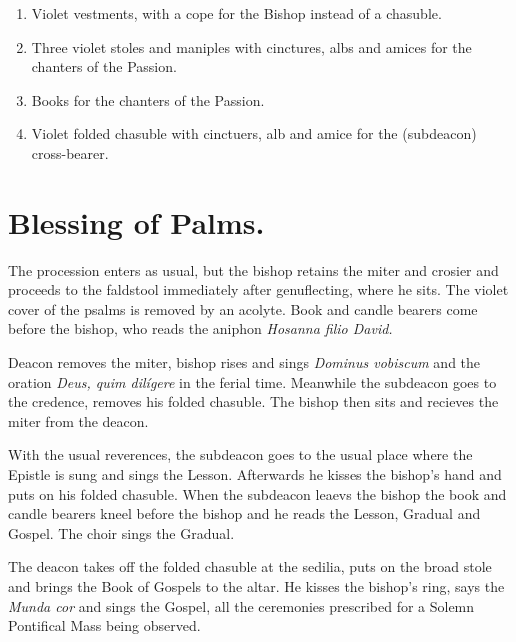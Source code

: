 {\begin{enumerate}[label=\Roman*.]
        \begin{enumerate}[label=\arabic*.]

            \item Violet vestments, with a cope for the Bishop instead of a
                chasuble.

            \item Three violet stoles and maniples with cinctures, albs and
                amices for the chanters of the Passion.

            \item Books for the chanters of the Passion.

            \item Violet folded chasuble with cinctuers, alb and amice for the
                (subdeacon) cross-bearer.

        \end{enumerate}

\end{enumerate}

\section{Blessing of Palms.}

\rubric The procession enters as usual, but the bishop retains the miter and
crosier and proceeds to the faldstool immediately after genuflecting, where he
sits. The violet cover of the psalms is removed by an acolyte. Book and candle
bearers come before the bishop, who reads the aniphon \textit{Hosanna filio
David.}

\rubric Deacon removes the miter, bishop rises and sings \textit{Dominus
vobiscum} and the oration \textit{Deus, quim dilígere} in the ferial time.
Meanwhile the subdeacon goes to the credence, removes his folded chasuble. The
bishop then sits and recieves the miter from the deacon. 

\rubric With the usual reverences, the subdeacon goes to the usual place where
the Epistle is sung and sings the Lesson. Afterwards he kisses the bishop's
hand and puts on his folded chasuble. When the subdeacon leaevs the bishop the
book and candle bearers kneel before the bishop and he reads the Lesson,
Gradual and Gospel. The choir sings the Gradual.

\rubric The deacon takes off the folded chasuble at the sedilia, puts on the
broad stole and brings the Book of Gospels to the altar. He kisses the bishop's
ring, says the \textit{Munda cor} and sings the Gospel, all the ceremonies
prescribed for a Solemn Pontifical Mass being observed.

}
